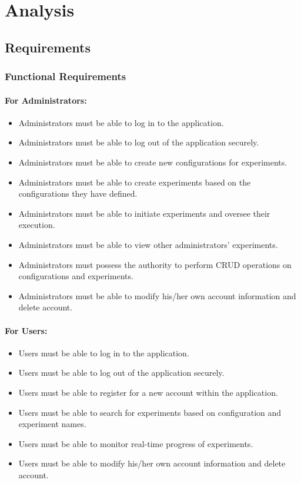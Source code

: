 \chapter{Analysis}

\section{Requirements}

\subsection{Functional Requirements}

\subsubsection{For Administrators:}

\begin{itemize}
    \item Administrators must be able to log in to the application.
    \item Administrators must be able to log out of the application securely.
    \item Administrators must be able to create new configurations for experiments.
    \item Administrators must be able to create experiments based on the configurations they have defined.
    \item Administrators must be able to initiate experiments and oversee their execution.
    \item Administrators must be able to view other administrators' experiments.
    \item Administrators must possess the authority to perform CRUD operations on configurations and experiments.
    \item Administrators must be able to modify his/her own account information and delete account.
\end{itemize}

\subsubsection{For Users:}

\begin{itemize}
    \item Users must be able to log in to the application.
    \item Users must be able to log out of the application securely.
    \item Users must be able to register for a new account within the application.
    \item Users must be able to search for experiments based on configuration and experiment names.
    \item Users must be able to monitor real-time progress of experiments.
    \item Users must be able to modify his/her own account information and delete account.
\end{itemize}

